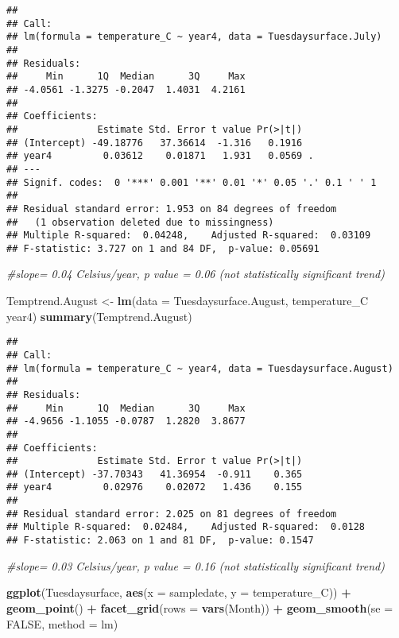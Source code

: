 \documentclass[]{article}
\newenvironment{Shaded}{\begin{snugshade}}{\end{snugshade}}
\newcommand{\CommentTok}[1]{\textcolor[rgb]{0.56,0.35,0.01}{\textit{#1}}}
\newcommand{\DataTypeTok}[1]{\textcolor[rgb]{0.13,0.29,0.53}{#1}}
\newcommand{\KeywordTok}[1]{\textcolor[rgb]{0.13,0.29,0.53}{\textbf{#1}}}
\newcommand{\NormalTok}[1]{#1}
\newcommand{\OperatorTok}[1]{\textcolor[rgb]{0.81,0.36,0.00}{\textbf{#1}}}
\newcommand{\OtherTok}[1]{\textcolor[rgb]{0.56,0.35,0.01}{#1}}
\newcommand{\StringTok}[1]{\textcolor[rgb]{0.31,0.60,0.02}{#1}}
\begin{document}
\begin{verbatim}
## 
## Call:
## lm(formula = temperature_C ~ year4, data = Tuesdaysurface.July)
## 
## Residuals:
##     Min      1Q  Median      3Q     Max 
## -4.0561 -1.3275 -0.2047  1.4031  4.2161 
## 
## Coefficients:
##              Estimate Std. Error t value Pr(>|t|)  
## (Intercept) -49.18776   37.36614  -1.316   0.1916  
## year4         0.03612    0.01871   1.931   0.0569 .
## ---
## Signif. codes:  0 '***' 0.001 '**' 0.01 '*' 0.05 '.' 0.1 ' ' 1
## 
## Residual standard error: 1.953 on 84 degrees of freedom
##   (1 observation deleted due to missingness)
## Multiple R-squared:  0.04248,    Adjusted R-squared:  0.03109 
## F-statistic: 3.727 on 1 and 84 DF,  p-value: 0.05691
\end{verbatim}

\begin{Shaded}
\begin{Highlighting}[]
\CommentTok{#slope= 0.04 Celsius/year, p value = 0.06 (not statistically significant trend)}

\NormalTok{Temptrend.August <-}\StringTok{ }\KeywordTok{lm}\NormalTok{(}\DataTypeTok{data =}\NormalTok{ Tuesdaysurface.August, temperature_C }\OperatorTok{~}\StringTok{ }\NormalTok{year4)}
\KeywordTok{summary}\NormalTok{(Temptrend.August)}
\end{Highlighting}
\end{Shaded}

\begin{verbatim}
## 
## Call:
## lm(formula = temperature_C ~ year4, data = Tuesdaysurface.August)
## 
## Residuals:
##     Min      1Q  Median      3Q     Max 
## -4.9656 -1.1055 -0.0787  1.2820  3.8677 
## 
## Coefficients:
##              Estimate Std. Error t value Pr(>|t|)
## (Intercept) -37.70343   41.36954  -0.911    0.365
## year4         0.02976    0.02072   1.436    0.155
## 
## Residual standard error: 2.025 on 81 degrees of freedom
## Multiple R-squared:  0.02484,    Adjusted R-squared:  0.0128 
## F-statistic: 2.063 on 1 and 81 DF,  p-value: 0.1547
\end{verbatim}

\begin{Shaded}
\begin{Highlighting}[]
\CommentTok{#slope= 0.03 Celsius/year, p value = 0.16 (not statistically significant trend)}

\KeywordTok{ggplot}\NormalTok{(Tuesdaysurface, }\KeywordTok{aes}\NormalTok{(}\DataTypeTok{x =}\NormalTok{ sampledate, }\DataTypeTok{y =}\NormalTok{ temperature_C)) }\OperatorTok{+}
\StringTok{  }\KeywordTok{geom_point}\NormalTok{() }\OperatorTok{+}
\StringTok{  }\KeywordTok{facet_grid}\NormalTok{(}\DataTypeTok{rows =} \KeywordTok{vars}\NormalTok{(Month)) }\OperatorTok{+}
\StringTok{  }\KeywordTok{geom_smooth}\NormalTok{(}\DataTypeTok{se =} \OtherTok{FALSE}\NormalTok{, }\DataTypeTok{method =}\NormalTok{ lm)}
\end{Highlighting}
\end{Shaded}
\end{document}
